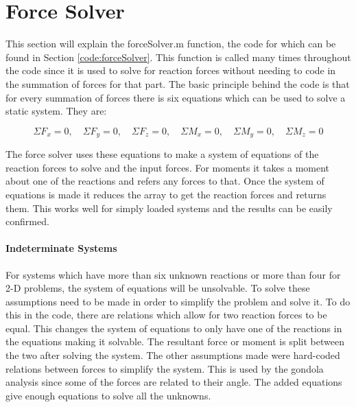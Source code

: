\documentclass[../main.tex]{subfiles}
\begin{document}
\section{Force Solver}\label{forceSolver}
This section will explain the forceSolver.m function, the code for which can be found in Section \ref{code:forceSolver}. This function is called many times throughout the code since it is used to solve for reaction forces without needing to code in the summation of forces for that part. The basic principle behind the code is that for every summation of forces there is six equations which can be used to solve a static system. They are:

\begin{equation}
\Sigma F_x = 0, \quad \Sigma F_y = 0, \quad \Sigma F_z = 0, \quad \Sigma M_x = 0, \quad \Sigma M_y = 0, \quad \Sigma M_z = 0
\end{equation}

The force solver uses these equations to make a system of equations of the reaction forces to solve and the input forces. For moments it takes a moment about one of the reactions and refers any forces to that. Once the system of equations is made it reduces the array to get the reaction forces and returns them. This works well for simply loaded systems and the results can be easily confirmed.

\paragraph{Indeterminate Systems}
For systems which have more than six unknown reactions or more than four for 2-D problems, the system of equations will be unsolvable. To solve these assumptions need to be made in order to simplify the problem and solve it. To do this in the code, there are relations which allow for two reaction forces to be equal. This changes the system of equations to only have one of the reactions in the equations making it solvable. The resultant force or moment is split between the two after solving the system. The other assumptions made were hard-coded relations between forces to simplify the system. This is used by the gondola analysis since some of the forces are related to their angle. The added equations give enough equations to solve all the unknowns.
\end{document}

